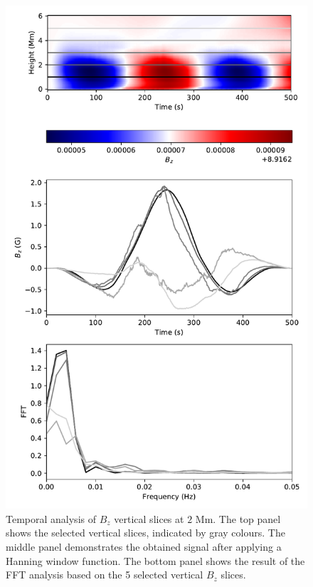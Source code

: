 \documentclass[linenumbers]{aastex63}
\begin{document}
\begin{figure}
    \centering
    \label{fft_sim1}
    \includegraphics[scale=0.55]{fft_sim.pdf}
    \caption{Temporal analysis of $B_{z}$ vertical slices at $2$ Mm. The top panel shows the selected vertical slices, indicated by gray colours. The middle panel demonstrates the obtained signal after applying a Hanning window function. The bottom panel shows the result of the FFT analysis based on the 5 selected vertical $B_{z}$ slices.}

\end{figure}
\end{document}
